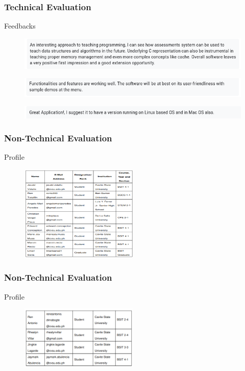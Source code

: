 \documentclass{beamer}
\begin{document}
\begin{frame}
	\frametitle{Technical Evaluation}
	\begin{block}{Feedbacks}
		\begin{figure}
			\includegraphics[width=\textwidth]{figures/feedbacks/tech1.png}
		\end{figure}
		\begin{figure}
			\includegraphics[width=\textwidth]{figures/feedbacks/tech2.png}
		\end{figure}
		\begin{figure}
			\includegraphics[width=\textwidth]{figures/feedbacks/tech3.png}
		\end{figure}
	\end{block}
\end{frame}

\begin{frame}
	\frametitle{Non-Technical Evaluation}
	\begin{block}{Profile}
		\begin{figure}
			\includegraphics[width=0.5\textwidth]{figures/non_tech_profile.png}
		\end{figure}
	\end{block}
\end{frame}

\begin{frame}
	\frametitle{Non-Technical Evaluation}
	\begin{block}{Profile}
		\begin{figure}
			\includegraphics[width=0.5\textwidth]{figures/non_tech_profile2.png}
		\end{figure}
	\end{block}
\end{frame}
\end{document}
